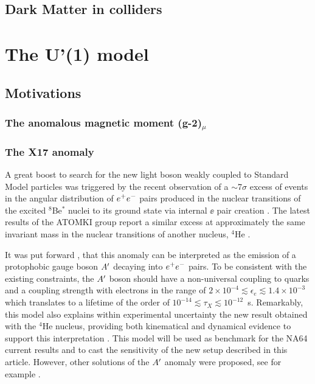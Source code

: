 \subsection{Dark Matter in colliders}
\label{chapter1:sec:dm-colliders}

\section{The U'(1) model}
\label{chapter1:sec:dm-u1model}

\subsection{Motivations}
\label{chapter1:sec:dm-u1model-motivations}

\subsubsection{The anomalous magnetic moment (g-2)$_{\mu}$}
\label{chapter1:sec:dm-u1model-motivations-g2}

\subsubsection{The X17 anomaly}
\label{chapter1:sec:dm-u1model-motivations-x17}

A great boost to search for the new light boson weakly coupled to Standard Model particles was triggered by the recent observation of a $\sim$7$\sigma$ excess of events in the angular distribution of $e^+e^-$ pairs produced in the nuclear transitions of the excited $^8$Be$^*$ nuclei to its ground state via internal $\ee$ pair creation \cite{Krasznahorkay:2015iga}. The latest results of the ATOMKI group report a similar excess at approximately the same invariant mass in the nuclear transitions of another nucleus, $^4$He \cite{Krasznahorkay:2019lyl}.

It was put forward  \cite{Feng:2016jff,PhysRevD.95.035017}, that this anomaly can be interpreted as the emission of a protophobic gauge boson $A'$ decaying into $e^+e^-$ pairs. To be consistent with the existing constraints, the $A'$ boson should have a non-universal coupling to quarks and a coupling strength with electrons in the range of $2\times 10^{-4} \lesssim \epsilon_e \lesssim 1.4\times 10^{-3}$ which translates to a lifetime of the order of $10^{-14}\lesssim \tau_X \lesssim 10^{-12}$~s. Remarkably, this model also explains within experimental uncertainty the new result obtained with the $^4$He nucleus, providing both kinematical and dynamical evidence to support this interpretation \cite{Feng:2020mbt}. This model will be used as benchmark for the NA64 current results and to cast the sensitivity of the new setup described in this article. However, other solutions of the $A'$ anomaly were proposed, see for example \cite{Nam:2019osu, Seto:2016pks}.

